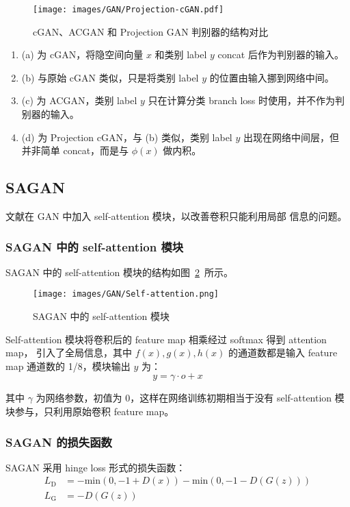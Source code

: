 \begin{figure}[ht]
  \centering
  \texttt{[image: images/GAN/Projection-cGAN.pdf]}
  \caption{cGAN、ACGAN 和 Projection GAN 判别器的结构对比}
  \label{fig:projection-gan}
\end{figure}

\begin{enumerate}
  \item (a) 为 cGAN，将隐空间向量 $x$ 和类别 label $y$ concat 后作为判别器的输入。
  \item (b) 与原始 cGAN 类似，只是将类别 label $y$ 的位置由输入挪到网络中间。
  \item (c) 为 ACGAN，类别 label $y$ 只在计算分类 branch loss 时使用，并不作为判
    别器的输入。
  \item (d) 为 Projection cGAN，与 (b) 类似，类别 label $y$ 出现在网络中间层，但
    并非简单 concat，而是与 $\phi(x)$ 做内积。
\end{enumerate}

\subsection{SAGAN}
文献在 GAN 中加入 self-attention 模块，以改善卷积只能利用局部
信息的问题。

\subsubsection{SAGAN 中的 self-attention 模块}
SAGAN 中的 self-attention 模块的结构如图~\ref{fig:self-attention}~所示。

\begin{figure}[ht]
  \centering
  \texttt{[image: images/GAN/Self-attention.png]}
  \caption{SAGAN 中的 self-attention 模块}
  \label{fig:self-attention}
\end{figure}

Self-attention 模块将卷积后的 feature map 相乘经过 softmax 得到 attention map，
引入了全局信息，其中 $f(x), g(x), h(x)$ 的通道数都是输入 feature map 通道数的
1/8，模块输出 $y$ 为：
\begin{equation}
  \label{equ:self-attention}
  y = \gamma \cdot o + x
\end{equation}

其中 $\gamma$ 为网络参数，初值为 0，这样在网络训练初期相当于没有 self-attention
模块参与，只利用原始卷积 feature map。

\subsubsection{SAGAN 的损失函数}
SAGAN 采用 hinge loss 形式的损失函数：
\begin{align}
  L_{\mathrm{D}} & = -\mathrm{min} \left( 0, -1 + D(x) \right) - \mathrm{min} \left( 0, -1-D(G(z)) \right) \\
  L_{\mathrm{G}} & = -D(G(z))
\end{align}

